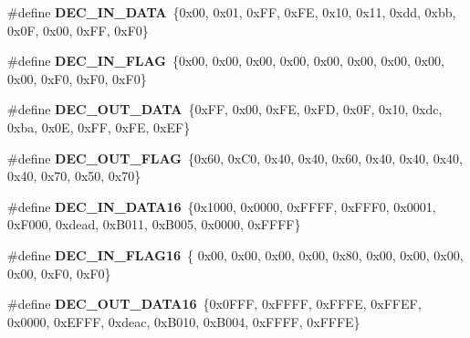 \begin{DoxyCompactItemize}
\item 
\mbox{\label{unit-test-cpu-dispatch_8c_ac01175fcbadda6ede6d46f45ff32dcce}} 
\#define {\bfseries D\+E\+C\+\_\+\+I\+N\+\_\+\+D\+A\+TA}~\{0x00, 0x01, 0x\+F\+F, 0x\+F\+E, 0x10, 0x11, 0xdd, 0xbb, 0x0\+F, 0x00, 0x\+F\+F, 0x\+F0\}
\item 
\mbox{\label{unit-test-cpu-dispatch_8c_ab8601c4621ff89d1ec09cb5369a5d1b0}} 
\#define {\bfseries D\+E\+C\+\_\+\+I\+N\+\_\+\+F\+L\+AG}~\{0x00, 0x00, 0x00, 0x00, 0x00, 0x00, 0x00, 0x00, 0x00, 0x\+F0, 0x\+F0, 0x\+F0\}
\item 
\mbox{\label{unit-test-cpu-dispatch_8c_ab7d97e7e3da9bd8bf9fe13b0a85c7a5b}} 
\#define {\bfseries D\+E\+C\+\_\+\+O\+U\+T\+\_\+\+D\+A\+TA}~\{0x\+F\+F, 0x00, 0x\+F\+E, 0x\+F\+D, 0x0\+F, 0x10, 0xdc, 0xba, 0x0\+E, 0x\+F\+F, 0x\+F\+E, 0x\+E\+F\}
\item 
\mbox{\label{unit-test-cpu-dispatch_8c_ad5714c88847280577f6abc6d2654c73d}} 
\#define {\bfseries D\+E\+C\+\_\+\+O\+U\+T\+\_\+\+F\+L\+AG}~\{0x60, 0x\+C0, 0x40, 0x40, 0x60, 0x40, 0x40, 0x40, 0x40, 0x70, 0x50, 0x70\}
\item 
\mbox{\label{unit-test-cpu-dispatch_8c_a49e4317e944feb62eaa6a69f2e7a2922}} 
\#define {\bfseries D\+E\+C\+\_\+\+I\+N\+\_\+\+D\+A\+T\+A16}~\{0x1000, 0x0000, 0x\+F\+F\+F\+F, 0x\+F\+F\+F0, 0x0001, 0x\+F000, 0xdead, 0x\+B011, 0x\+B005, 0x0000, 0x\+F\+F\+F\+F\}
\item 
\mbox{\label{unit-test-cpu-dispatch_8c_a3bbea8e4629c9375196d7bc75478768a}} 
\#define {\bfseries D\+E\+C\+\_\+\+I\+N\+\_\+\+F\+L\+A\+G16}~\{  0x00,   0x00,   0x00,   0x00,   0x80,   0x00,   0x00,   0x00,   0x00,   0x\+F0,   0x\+F0\}
\item 
\mbox{\label{unit-test-cpu-dispatch_8c_ae8b7cd663c73eacf5c6011b50bcf5203}} 
\#define {\bfseries D\+E\+C\+\_\+\+O\+U\+T\+\_\+\+D\+A\+T\+A16}~\{0x0\+F\+F\+F, 0x\+F\+F\+F\+F, 0x\+F\+F\+F\+E, 0x\+F\+F\+E\+F, 0x0000, 0x\+E\+F\+F\+F, 0xdeac, 0x\+B010, 0x\+B004, 0x\+F\+F\+F\+F, 0x\+F\+F\+F\+E\}
\item 
\mbox{\label{unit-test-cpu-dispatch_8c_a1e043adae6874806212dfe6367ae4850}} 

\end{DoxyCompactItemize}

